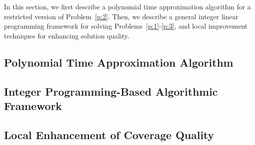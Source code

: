 In this section, we first describe a polynomial time approximation algorithm for a restricted version of Problem~\ref{p:2}. Then, we describe a general integer linear programming framework for solving Problems~\ref{p:1}-\ref{p:3},
and local improvement techniques for enhancing solution quality.

\subsection{Polynomial Time Approximation Algorithm}
\vspace{-1mm}


\vspace{-1mm}
\subsection{Integer Programming-Based Algorithmic Framework}


\subsection{Local Enhancement of Coverage Quality}
